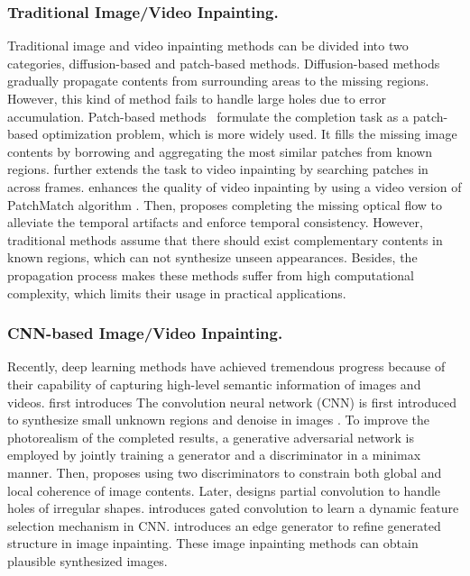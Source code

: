 \subsubsection{Traditional Image/Video Inpainting.}
Traditional image and video inpainting methods can be divided into two categories, diffusion-based and patch-based methods. 
Diffusion-based methods \cite{bertalmio2000image,ballester2001filling} gradually propagate contents from surrounding areas to the missing regions. 
However, this kind of method fails to handle large holes due to error accumulation. 
Patch-based methods~\cite{bertalmio2003simultaneous,efros2001image} formulate the completion task as a patch-based optimization problem, which is more widely used. 
It fills the missing image contents by borrowing and aggregating the most similar patches from known regions. 
\cite{patwardhan2007video} further extends the task to video inpainting by searching patches in across frames. \cite{newson2014video} enhances the quality of video inpainting by using a video version of PatchMatch algorithm \cite{barnes2009patchmatch}. 
Then, \cite{huang2016temporally} proposes completing the missing optical flow to alleviate the temporal artifacts and enforce temporal consistency. 
However, traditional methods assume that there should exist complementary contents in known regions, which can not synthesize unseen appearances. Besides, the propagation process makes these methods suffer from high computational complexity, which limits their usage in practical applications. 

\subsubsection{CNN-based Image/Video Inpainting.}
Recently, deep learning methods  have achieved tremendous progress because of their capability of capturing high-level semantic information of images and videos. 
first introduces 
The convolution neural network (CNN) is first introduced to synthesize small unknown regions and denoise in images \cite{xie2012image}. 
To improve the photorealism of the completed results, a generative adversarial network is employed \cite{pathak2016context} by jointly training a generator and a discriminator in a minimax manner. 
Then, \cite{iizuka2017globally} proposes using two discriminators to constrain both global and local coherence of image contents. Later, \cite{liu2018partialinpainting} designs partial convolution to handle holes of irregular shapes. \cite{yu2018free} introduces gated convolution to learn a dynamic feature selection mechanism in CNN.
%
\cite{nazeri2019edgeconnect} introduces an edge generator to refine generated structure in image inpainting. These image inpainting methods can obtain plausible synthesized images. 


